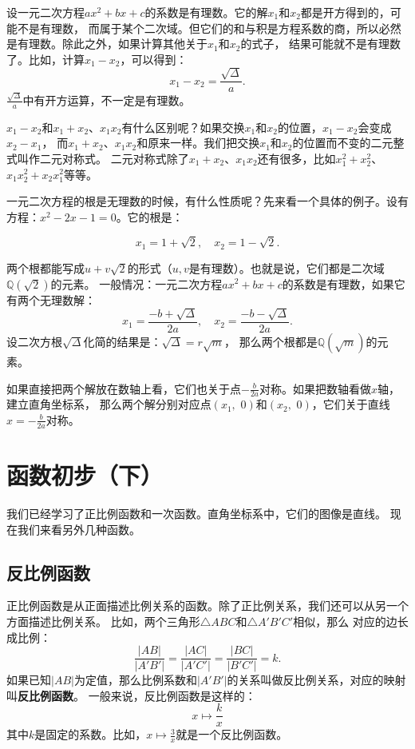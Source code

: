 \documentclass[12pt,UTF8,fontset=none]{ctexbook}
\begin{document}
设一元二次方程$ax^2 + bx + c$的系数是有理数。它的解$x_1$和$x_2$都是开方得到的，可能不是有理数，
而属于某个二次域。但它们的和与积是方程系数的商，所以必然是有理数。除此之外，如果计算其他关于$x_1$和$x_2$的式子，
结果可能就不是有理数了。比如，计算$x_1 - x_2$，可以得到：
$$ x_1 - x_2 = \frac{\sqrt{\Delta}}{a}. $$
$\frac{\sqrt{\Delta}}{a}$中有开方运算，不一定是有理数。

$x_1 - x_2$和$x_1 + x_2$、$x_1x_2$有什么区别呢？如果交换$x_1$和$x_2$的位置，$x_1 - x_2$会变成$x_2 - x_1$，
而$x_1 + x_2$、$x_1x_2$和原来一样。我们把交换$x_1$和$x_2$的位置而不变的二元整式叫作二元对称式。
二元对称式除了$x_1 + x_2$、$x_1x_2$还有很多，比如$x_1^2 + x_2^2$、$x_1x_2^2 + x_2x_1^2$等等。

一元二次方程的根是无理数的时候，有什么性质呢？先来看一个具体的例子。设有方程：$x^2 - 2x - 1 = 0$。它的根是：

$$ x_1 = 1 + \sqrt{2}, \quad x_2 = 1 - \sqrt{2}.$$

两个根都能写成$u + v\sqrt{2}$的形式（$u,v$是有理数）。也就是说，它们都是二次域$\mathbb{Q}(\sqrt{2})$的元素。
一般情况：一元二次方程$ax^2 + bx + c$的系数是有理数，如果它有两个无理数解：
$$x_{1} = \frac{-b + \sqrt{\Delta}}{2a},\quad x_{2} = \frac{-b - \sqrt{\Delta}}{2a}.$$
设二次方根$\sqrt{\Delta}$化简的结果是：$\sqrt{\Delta} = r\sqrt{m}$，
那么两个根都是$\mathbb{Q}(\sqrt{m})$的元素。

如果直接把两个解放在数轴上看，它们也关于点$-\frac{b}{2a}$对称。如果把数轴看做$x$轴，建立直角坐标系，
那么两个解分别对应点$(x_1, \,\,0)$和$(x_2, \,\,0)$，它们关于直线$x = -\frac{b}{2a}$对称。

\chapter{函数初步（下）}
我们已经学习了正比例函数和一次函数。直角坐标系中，它们的图像是直线。
现在我们来看另外几种函数。

\section{反比例函数}
正比例函数是从正面描述比例关系的函数。除了正比例关系，我们还可以从另一个方面描述比例关系。
比如，两个三角形$\triangle ABC$和$\triangle A'B'C'$相似，那么
对应的边长成比例：
$$ \frac{|AB|}{|A'B'|} = \frac{|AC|}{|A'C'|} = \frac{|BC|}{|B'C'|} = k.$$
如果已知$|AB|$为定值，那么比例系数和$|A'B'|$的关系叫做反比例关系，对应的映射叫\textbf{反比例函数}。
一般来说，反比例函数是这样的：
$$ x \mapsto \frac{k}{x}$$
其中$k$是固定的系数。比如，$x \mapsto \frac{3}{x}$就是一个反比例函数。
\end{document}
